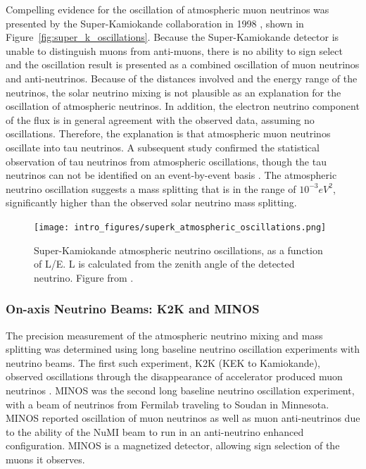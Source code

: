 Compelling evidence for the oscillation of atmospheric muon neutrinos was presented by the Super-Kamiokande collaboration in 1998 \cite{PhysRevLett.81.1562}, shown in Figure~\ref{fig:super_k_oscillations}.  Because the Super-Kamiokande detector is unable to distinguish muons from anti-muons, there is no ability to sign select and the oscillation result is presented as a combined oscillation of muon neutrinos and anti-neutrinos.  Because of the distances involved and the energy range of the neutrinos, the solar neutrino mixing is not plausible as an explanation for the oscillation of atmospheric neutrinos.  In addition, the electron neutrino component of the flux is in general agreement with the observed data, assuming no oscillations.  Therefore, the explanation is that atmospheric muon neutrinos oscillate into tau neutrinos.  A subsequent study confirmed the statistical observation of tau neutrinos from atmospheric oscillations, though the tau neutrinos can not be identified on an event-by-event basis \cite{PhysRevLett.110.181802}.  The atmospheric neutrino oscillation suggests a mass splitting that is in the range of $10^{-3} eV^2$, significantly higher than the observed solar neutrino mass splitting.

\begin{figure}[htbp]
  \centering
  \texttt{[image: intro\_figures/superk\_atmospheric\_oscillations.png]}
  \caption[Super-K Neutrino Oscillations]{Super-Kamiokande atmospheric neutrino oscillations, as a function of L/E.  L is calculated from the zenith angle of the detected neutrino. Figure from \cite{PhysRevLett.93.101801}.}
  \label{fig:label}
\end{figure}

\subsubsection{On-axis Neutrino Beams: K2K and MINOS}

The precision measurement of the atmospheric neutrino mixing and mass splitting was determined using long baseline neutrino oscillation experiments with neutrino beams.  The first such experiment, K2K (KEK to Kamiokande), observed oscillations through the disappearance of accelerator produced muon neutrinos \cite{PhysRevD.74.072003}.  MINOS was the second long baseline neutrino oscillation experiment, with a beam of neutrinos from Fermilab traveling to Soudan in Minnesota.  MINOS reported oscillation \cite{PhysRevLett.106.181801} of muon neutrinos as well as muon anti-neutrinos due to the ability of the NuMI beam to run in an anti-neutrino enhanced configuration.  MINOS is a magnetized detector, allowing sign selection of the muons it observes.

